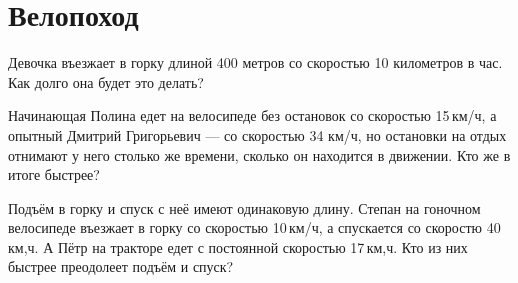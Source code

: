 \section{Велопоход}
\begin{itemize}

\itA Девочка въезжает в горку длиной 400 метров со скоростью 10 километров в час. Как долго она будет это делать?

\itB Начинающая Полина едет на велосипеде без остановок со скоростью 15\,км/ч, а опытный Дмитрий Григорьевич — со скоростью 34 км/ч, но остановки на отдых отнимают у него столько же времени, сколько он находится в движении. Кто же в итоге быстрее?

\itC Подъём в горку и спуск с неё имеют одинаковую длину. Степан на гоночном велосипеде въезжает в горку со скоростью 10\,км/ч, а спускается со скоростю 40\,км,ч. А Пётр на тракторе едет с постоянной скоростью 17\,км,ч. Кто из них быстрее преодолеет подъём и спуск?
\end{itemize}